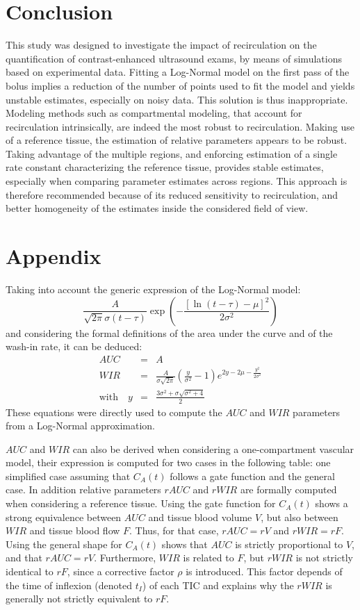 \section{Conclusion}
This study was designed to investigate the impact of recirculation on the quantification of contrast-enhanced ultrasound exams, by means of simulations based on experimental data. 
Fitting a Log-Normal model on the first pass of the bolus implies a reduction of the number of points used to fit the model and yields unstable estimates, especially on noisy data. This solution is thus inappropriate. Modeling methods such as compartmental modeling, that account for recirculation intrinsically, are indeed the most robust to recirculation. Making use of a reference tissue, the estimation of relative parameters appears to be robust. Taking advantage of the multiple regions, and enforcing estimation of a single rate constant characterizing the reference tissue, provides stable estimates, especially when comparing parameter estimates across regions. This approach is therefore recommended because of its reduced sensitivity to recirculation, and better homogeneity of the estimates inside the considered field of view. 

\section*{Appendix}
Taking into account the generic expression of the Log-Normal model:
\begin{equation*}
\frac{A}{\sqrt{2 \pi}\sigma (t- \tau)} \exp \left( - \frac{\left[ \ln{(t- \tau)} - \mu \right]^2}{2{\sigma}^2} \right)
\end{equation*}
and considering the formal definitions of the area under the curve and of the wash-in rate, it can be deduced:
\begin{eqnarray*}
AUC &= & A \\
WIR &= &\frac{A}{\sigma\sqrt{2\pi}}\left(\frac{y}{\sigma^2}-1\right)e^{2y-2\mu-\frac{y^2}{2\sigma^2}} \\
\text{with} \quad y &= &\frac{3\sigma^2+\sigma\sqrt{\sigma^2+4}}{2}
\end{eqnarray*}
These equations were directly used to compute the $AUC$ and $WIR$ parameters from a Log-Normal approximation.

$AUC$ and $WIR$ can also be derived when considering a one-compartment vascular model, their expression is computed for two cases in the following table: one simplified case assuming that $C_A(t)$ follows a gate function and the general case. In addition relative parameters $rAUC$ and $rWIR$ are formally computed when considering a reference tissue. 
Using the gate function for $C_A(t)$ shows a strong equivalence between $AUC$ and tissue blood volume $V$, but also between $WIR$ and tissue blood flow $F$. Thus, for that case, $rAUC = rV$ and $rWIR = rF$. 
Using the general shape for $C_A(t)$ shows that $AUC$ is strictly proportional to $V$, and that $rAUC = rV$. Furthermore, $WIR$ is related to $F$, but $rWIR$ is not strictly identical to $rF$, since a corrective factor $\rho$ is introduced. This factor depends of the time of inflexion (denoted $t_I$) of each TIC and explains why the $rWIR$ is generally not strictly equivalent to $rF$.

